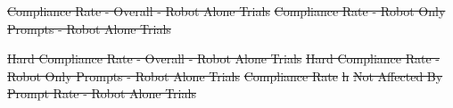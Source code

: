 \documentclass{ut-thesis}
\providecommand{\DIFdeltex}[1]{{\protect\color{red}\sout{#1}}}                      %
\providecommand{\DIFdelFL}[1]{\DIFdel{#1}} %
\providecommand{\DIFdel}[1]{\texorpdfstring{\DIFdeltex{#1}}{}} %
\begin{document}
{%
\DIFdelFL{Compliance Rate - Overall - Robot Alone Trials}}
{%
\DIFdelFL{Compliance Rate - Robot Only Prompts - Robot Alone Trials}}

{%
\DIFdelFL{Hard Compliance Rate - Overall - Robot Alone Trials}}
{%
\DIFdelFL{Hard Compliance Rate - Robot Only Prompts - Robot Alone Trials}}
{%
\DIFdelFL{Compliance Rate}}
\DIFdelFL{h}%
{%
\DIFdelFL{Not Affected By Prompt Rate - Robot Alone Trials}}
\end{document}
